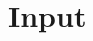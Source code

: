 \documentclass[article]{bioinf}\usepackage[]{graphicx}\usepackage[]{color}
\newcommand{\panelcnmops}{\texttt{panelcn.mops}}
\newcommand{\cnmops}{\texttt{cn.mops}}
\begin{document}
\section{Input}
\label{s:input}
% 
% 
% 
\end{document}
